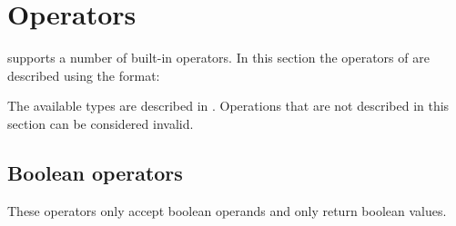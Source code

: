 \section{Operators}

\productname{} supports a number of built-in operators. In this section the operators
of \productname{} are described using the format:


The available types are described in .
Operations that are not described in this section can be considered invalid.

\subsection{Boolean operators}

These operators only accept boolean operands and only return boolean values.

